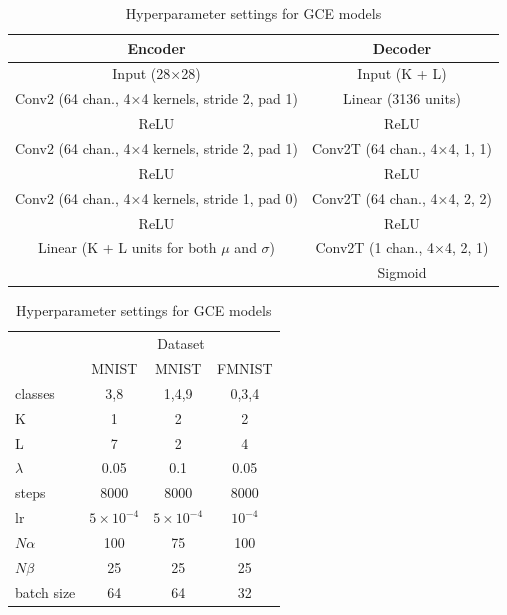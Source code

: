 \begin{table}[h]
    \caption{GCE network architecture used for MNIST and fMNIST experiments}\label{tab:gce_architecture}
    \begin{tabular}{|c|c|}
    \toprule[1.5pt]
    Encoder & Decoder\\
    \hline
    Input (28×28) & Input (K + L)\\
    Conv2 (64 chan., 4×4 kernels, stride 2, pad 1) & Linear (3136 units)\\
    ReLU& ReLU\\
    Conv2 (64 chan., 4×4 kernels, stride 2, pad 1) & Conv2T (64 chan., 4×4, 1, 1)\\
    ReLU& ReLU\\
    Conv2 (64 chan., 4×4 kernels, stride 1, pad 0) & Conv2T (64 chan., 4×4, 2, 2)\\
    ReLU& ReLU\\
    Linear (K + L units for both $\mu$ and $\sigma$)& Conv2T (1 chan., 4×4, 2, 1)\\
    & Sigmoid\\
    \hline
    \end{tabular}
    \begin{minipage}{0.45\linewidth}
        \centering
        \caption{Hyperparameter settings for GCE models}\label{tab:hyperparameter_gce}
        \begin{tabular}{l |c c c}
        \toprule
        \multicolumn{1}{c}{} & \multicolumn{3}{|c}{Dataset}\\
        \cline{2-4}
        \multicolumn{1}{c}{}&\multicolumn{1}{|c}{MNIST}  & \multicolumn{1}{c}{MNIST}  & \multicolumn{1}{c}{FMNIST} \\
        \midrule
       	{\tiny classes} & 3,8 & 1,4,9 & 0,3,4\\ 
 		K & 1 &  2  &2  \\
  		L & 7& 2 & 4\\
 	 	$\lambda$  & 0.05 & 0.1 & 0.05\\
  		steps & 8000 & 8000 & 8000\\
 		lr & $5 \times 10^{-4}$ & $5 \times 10^{-4}$ & $10^{-4}$\\
  		$N\alpha$ & 100 & 75 & 100\\
  		$N\beta$ &  25 & 25 & 25\\
 	 	{\tiny batch size} &  64 & 64 & 32\\
        \bottomrule
      \end{tabular}
    \end{minipage}
    \hspace{1cm}
    \begin{minipage}{0.45\linewidth}

\end{minipage}
\end{table}
